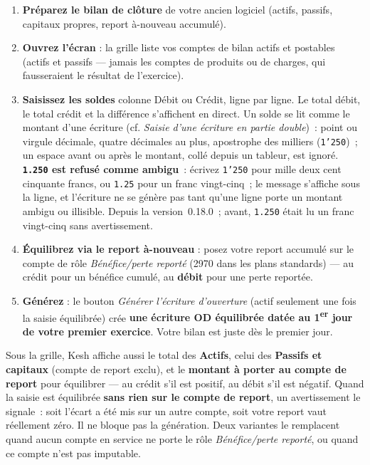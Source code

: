 \documentclass[a4paper,11pt,oneside]{article}
\begin{document}
\begin{enumerate}
    \item \textbf{Préparez le bilan de clôture} de votre ancien logiciel (actifs, passifs, capitaux propres, report à-nouveau accumulé).
    \item \textbf{Ouvrez l'écran} : la grille liste vos comptes de bilan actifs et postables (actifs et passifs — jamais les comptes de produits ou de charges, qui fausseraient le résultat de l'exercice).
    \item \textbf{Saisissez les soldes} colonne Débit ou Crédit, ligne par ligne. Le total débit, le total crédit et la différence s'affichent en direct. Un solde se lit comme le montant d'une écriture (cf. \emph{Saisie d'une écriture en partie double})~: point ou virgule décimale, quatre décimales au plus, apostrophe des milliers (\texttt{1'250})~; un espace avant ou après le montant, collé depuis un tableur, est ignoré. \textbf{\texttt{1.250} est refusé comme ambigu}~: écrivez \texttt{1'250} pour mille deux cent cinquante francs, ou \texttt{1.25} pour un franc vingt-cinq~; le message s'affiche sous la ligne, et l'écriture ne se génère pas tant qu'une ligne porte un montant ambigu ou illisible. Depuis la version~0.18.0~; avant, \texttt{1.250} était lu un franc vingt-cinq sans avertissement.
    \item \textbf{Équilibrez via le report à-nouveau} : posez votre report accumulé sur le compte de rôle \emph{Bénéfice/perte reporté} (2970 dans les plans standards) — au crédit pour un bénéfice cumulé, au \textbf{débit} pour une perte reportée.
    \item \textbf{Générez} : le bouton \emph{Générer l'écriture d'ouverture} (actif seulement une fois la saisie équilibrée) crée \textbf{une écriture OD équilibrée datée au 1\textsuperscript{er} jour de votre premier exercice}. Votre bilan est juste dès le premier jour.
\end{enumerate}

Sous la grille, Kesh affiche aussi le total des \textbf{Actifs}, celui des \textbf{Passifs et capitaux} (compte de report exclu), et le \textbf{montant à porter au compte de report} pour équilibrer — au crédit s'il est positif, au débit s'il est négatif. Quand la saisie est équilibrée \textbf{sans rien sur le compte de report}, un avertissement le signale~: soit l'écart a été mis sur un autre compte, soit votre report vaut réellement zéro. Il ne bloque pas la génération. Deux variantes le remplacent quand aucun compte en service ne porte le rôle \emph{Bénéfice/perte reporté}, ou quand ce compte n'est pas imputable.
\end{document}
